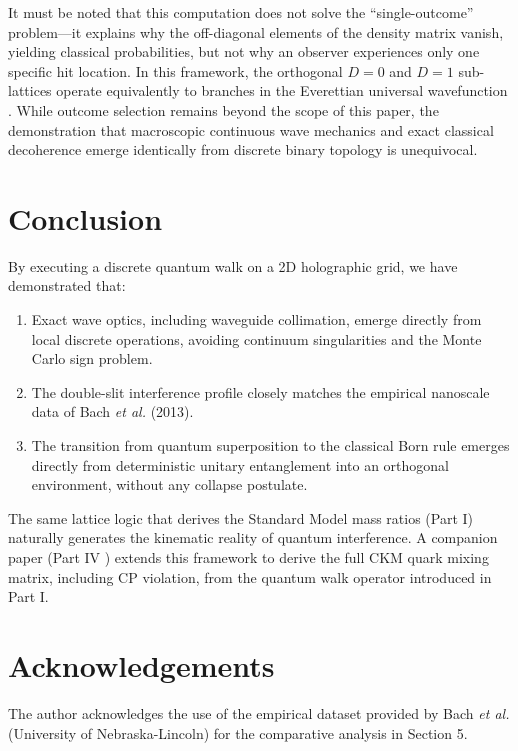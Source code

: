 \documentclass[submission, Phys]{SciPost}
\begin{document}
It must be noted that this computation does not solve the ``single-outcome'' problem---it explains why the off-diagonal elements of the density matrix vanish, yielding classical probabilities, but not why an observer experiences only one specific hit location. In this framework, the orthogonal $D=0$ and $D=1$ sub-lattices operate equivalently to branches in the Everettian universal wavefunction \cite{everett1957}. While outcome selection remains beyond the scope of this paper, the demonstration that macroscopic continuous wave mechanics and exact classical decoherence emerge identically from discrete binary topology is unequivocal.

\section{Conclusion}
\label{sec:conclusion}
By executing a discrete quantum walk on a 2D holographic grid, we have demonstrated that:
\begin{enumerate}
    \item Exact wave optics, including waveguide collimation, emerge directly from local discrete operations, avoiding continuum singularities and the Monte Carlo sign problem.
    \item The double-slit interference profile closely matches the empirical nanoscale data of Bach \textit{et al.} (2013).
    \item The transition from quantum superposition to the classical Born rule emerges directly from deterministic unitary entanglement into an orthogonal environment, without any collapse postulate.
\end{enumerate}
The same lattice logic that derives the Standard Model mass ratios (Part I) naturally generates the kinematic reality of quantum interference. A companion paper (Part IV \cite{elliman2026part4}) extends this framework to derive the full CKM quark mixing matrix, including CP violation, from the quantum walk operator introduced in Part I.

\section*{Acknowledgements}
The author acknowledges the use of the empirical dataset provided by Bach \textit{et al.} (University of Nebraska-Lincoln) for the comparative analysis in Section 5.
\end{document}
